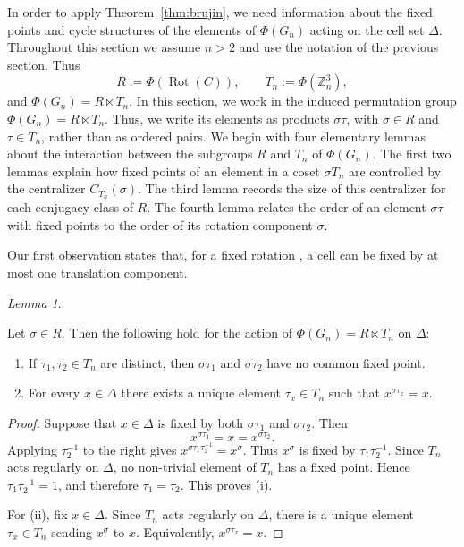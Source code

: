 \documentclass[12pt]{article}
\theoremstyle{definition}
\theoremstyle{remark}
\newtheorem{lemma}[theorem]{Lemma}
\DeclareMathOperator{\Rot}{Rot}
\begin{document}
In order to apply Theorem~\ref{thm:brujin}, we need information about the fixed points and cycle structures of the elements of $\Phi(G_n)$ acting on the cell set $\Delta$. Throughout this section we assume $n>2$ and use the notation of the previous section. Thus
\[
R:=\Phi(\Rot(C)), \qquad T_n:=\Phi(\mathbb Z_n^3),
\]
and $\Phi(G_n)=R\ltimes T_n$. In this section, we work in the induced permutation group $\Phi(G_n)=R\ltimes T_n$. Thus, we write its elements as products $\sigma\tau$, with $\sigma\in R$ and $\tau\in T_n$, rather than as ordered pairs. We begin with four elementary lemmas about the interaction between the subgroups $R$ and $T_n$ of $\Phi(G_n)$. The first two lemmas explain how fixed points of an element in a coset $\sigma T_n$ are controlled by the centralizer $C_{T_n}(\sigma)$. The third lemma records the size of this centralizer for each conjugacy class of $R$. The fourth lemma relates the order of an element $\sigma\tau$ with fixed points to the order of its rotation component $\sigma$.

Our first observation states that, for a fixed rotation , a cell can be fixed by at most one translation component.
\begin{lemma}\label{lem:one}

Let $\sigma\in R$. Then the following hold for the action of $\Phi(G_n)=R\ltimes T_n$ on $\Delta$:
\begin{enumerate}
\item[(i)] If $\tau_1,\tau_2\in T_n$ are distinct, then $\sigma\tau_1$ and $\sigma\tau_2$ have no common fixed point.
\item[(ii)] For every $x\in\Delta$ there exists a unique element $\tau_x\in T_n$ such that $x^{\sigma\tau_x}=x$.
\end{enumerate}
\end{lemma}
\begin{proof}
Suppose that $x\in\Delta$ is fixed by both $\sigma\tau_1$ and $\sigma\tau_2$. Then
\[
x^{\sigma\tau_1}=x=x^{\sigma\tau_2}.
\]
Applying $\tau_2^{-1}$ to the right gives
$x^{\sigma\tau_1\tau_2^{-1}}=x^\sigma.
$
Thus $x^\sigma$ is fixed by $\tau_1\tau_2^{-1}$. Since $T_n$ acts regularly on $\Delta$, no non-trivial element of $T_n$ has a fixed point. Hence $\tau_1\tau_2^{-1}=1$, and therefore $\tau_1=\tau_2$. This proves (i).

For (ii), fix $x\in\Delta$. Since $T_n$ acts regularly on $\Delta$, there is a unique element $\tau_x\in T_n$ sending $x^\sigma$ to $x$. Equivalently, $x^{\sigma\tau_x}=x$.
\end{proof}
\end{document}
